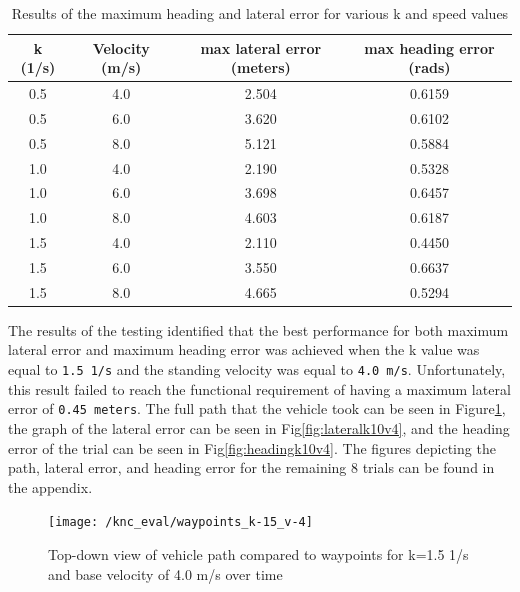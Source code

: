 \documentclass[titlepage, draft]{article}
\begin{document}
{\begin{table}
	\centering
	\begin{tabular}{| c | c | c | c |}
		\hline
		k (1/s) & Velocity (m/s) & max lateral error (meters) & max heading error (rads) \\ [0.5ex]
		\hline
		0.5     & 4.0            & 2.504                      & 0.6159                   \\
		\hline
		0.5     & 6.0            & 3.620                      & 0.6102                   \\
		\hline
		0.5     & 8.0            & 5.121                      & 0.5884                   \\
		\hline
		1.0     & 4.0            & 2.190                      & 0.5328                   \\
		\hline
		1.0     & 6.0            & 3.698                      & 0.6457                   \\
		\hline
		1.0     & 8.0            & 4.603                      & 0.6187                   \\
		\hline
		1.5     & 4.0            & 2.110                      & 0.4450                   \\
		\hline
		1.5     & 6.0            & 3.550                      & 0.6637                   \\
		\hline
		1.5     & 8.0            & 4.665                      & 0.5294                   \\
		\hline
	\end{tabular}
	\caption{Results of the maximum heading and lateral error for various k and speed values}
	\label{tab:controller_test_values}
\end{table}

The results of the testing identified that the best performance for both maximum lateral error and maximum heading error was achieved when the k value was equal to \texttt{1.5 1/s} and the standing velocity was equal to \texttt{4.0 m/s}. Unfortunately, this result failed to reach the functional requirement of having a maximum lateral error of \texttt{0.45 meters}. The full path that the vehicle took can be seen in Figure\ref{fig:waypointsk10v4}, the graph of the lateral error can be seen in Fig\ref{fig:lateralk10v4}, and the heading error of the trial can be seen in Fig\ref{fig:headingk10v4}. The figures depicting the path, lateral error, and heading error for the remaining 8 trials can be found in the appendix.

\begin{figure}
	\centering
	\texttt{[image: /knc\_eval/waypoints\_k-15\_v-4]}
	\caption{Top-down view of vehicle path compared to waypoints for k=1.5 1/s and base velocity of 4.0 m/s over time}
	\label{fig:waypointsk10v4}
\end{figure}

}
\end{document}

